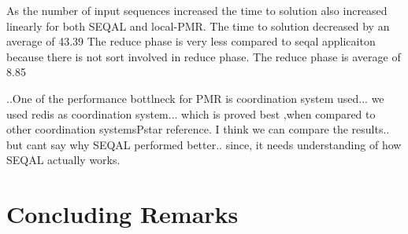 \documentclass{sig-alternate}
\begin{document}
As the number of input sequences increased the time to solution also increased linearly for both SEQAL and local-PMR. 
The time to solution decreased by an average of 43.39%
The reduce phase is very less compared to seqal applicaiton because there is not sort involved in reduce phase.
The reduce phase is average of 8.85%

..One of the performance bottlneck for PMR is coordination system used... we used redis as coordination system... which is proved best ,when compared to other coordination systems{Pstar reference}. I think we can compare the results.. but cant say why SEQAL performed better.. since, it needs understanding of how SEQAL actually works.




\section{Concluding Remarks}


%  
\end{document}
